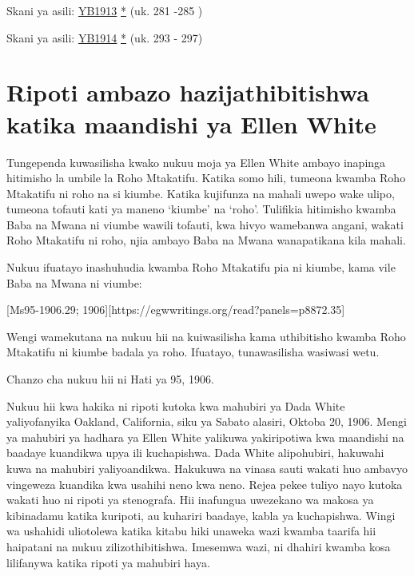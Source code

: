 

Skani ya asili: \href{https://documents.adventistarchives.org/Yearbooks/YB1913.pdf#search=Yearbook%201913}{YB1913} \href{https://forgotten-pillar.s3.us-east-2.amazonaws.com/YB1913.pdf}{*} (uk. 281 -285 )




Skani ya asili: \href{https://documents.adventistarchives.org/Yearbooks/YB1914.pdf#search=Yearbook%201914}{YB1914} \href{https://forgotten-pillar.s3.us-east-2.amazonaws.com/YB1914.pdf}{*} (uk. 293 - 297)



\section*{Ripoti ambazo hazijathibitishwa katika maandishi ya Ellen White}




\label{appendix:unauthenticated-reports}
Tungependa kuwasilisha kwako nukuu moja ya Ellen White ambayo inapinga hitimisho la umbile la Roho Mtakatifu. Katika somo hili, tumeona kwamba Roho Mtakatifu ni roho na si kiumbe. Katika kujifunza  na mahali uwepo wake ulipo, tumeona tofauti kati ya maneno ‘kiumbe’ na ‘roho’. Tulifikia hitimisho kwamba Baba na Mwana ni viumbe wawili tofauti, kwa hivyo wamebanwa angani, wakati Roho Mtakatifu ni roho, njia ambayo Baba na Mwana wanapatikana kila mahali.


Nukuu ifuatayo inashuhudia kwamba Roho Mtakatifu pia ni kiumbe, kama vile Baba na Mwana ni viumbe:


[Ms95-1906.29; 1906][https://egwwritings.org/read?panels=p8872.35]


Wengi wamekutana na nukuu hii na kuiwasilisha kama uthibitisho kwamba Roho Mtakatifu ni kiumbe badala ya roho. Ifuatayo, tunawasilisha wasiwasi wetu.


Chanzo cha nukuu hii ni Hati ya 95, 1906.


Nukuu hii kwa hakika ni ripoti kutoka kwa mahubiri ya Dada White yaliyofanyika Oakland, California, siku ya Sabato alasiri, Oktoba 20, 1906. Mengi ya mahubiri ya hadhara ya Ellen White yalikuwa yakiripotiwa kwa maandishi na baadaye kuandikwa upya ili kuchapishwa. Dada White alipohubiri, hakuwahi kuwa na mahubiri yaliyoandikwa. Hakukuwa na vinasa sauti wakati huo ambavyo vingeweza kuandika kwa usahihi neno kwa neno. Rejea pekee tuliyo nayo kutoka wakati huo ni ripoti ya stenografa. Hii inafungua uwezekano wa makosa ya kibinadamu katika kuripoti, au kuhariri baadaye, kabla ya kuchapishwa. Wingi wa ushahidi uliotolewa katika kitabu hiki unaweka wazi kwamba taarifa hii haipatani na nukuu zilizothibitishwa. Imesemwa wazi, ni dhahiri kwamba kosa lilifanywa katika ripoti ya mahubiri haya.



